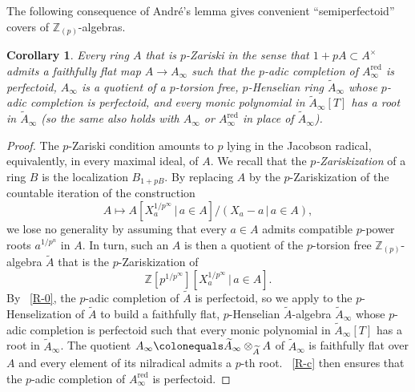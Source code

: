 \documentclass[11pt, reqno]{amsart}
\newcommand{\bZ}{\mathbb{Z}}
\newcommand{\ce}{\colonequals}
\newcommand{\ra}{\rightarrow}
\newcommand{\red}{{\mathrm{red}}}		%
\newcommand{\tensor}{\otimes} 			%
\newcommand{\wt}{\widetilde}
\providecommand{\up}[1]{{\upshape(}#1{\upshape)}}
\newcommand{\bpf}{\begin{proof}}
\newcommand{\epf}{\end{proof}}
\newcommand{\bcor}{\begin{cor}}
\newcommand{\ecor}{\end{cor}}
\newcommand{\brem}{\begin{rem}}
\newcommand{\erem}{\end{rem}}
\numberwithin{equation}{numberingbase}
\theoremstyle{thms}
\newtheorem{cor}[numberingbase]{Corollary}
\theoremstyle{claims}
\theoremstyle{defs}
\newtheorem{rem}[numberingbase]{Remark}
\theoremstyle{thms}
\theoremstyle{defs}
\theoremstyle{subsection-tweak}
\theoremstyle{subsection-tweak}
\begin{document}


The following consequence of Andr\'{e}'s lemma gives convenient ``semiperfectoid'' covers of $\bZ_{(p)}$-algebras. 

\bcor \label{cor:semiperfectoid-cover}
Every ring $A$ that is $p$-Zariski in the sense that $1 + pA \subset A^\times$ admits a faithfully flat map $A \ra A_\infty$ such that the $p$-adic completion of $A_\infty^\red$ is perfectoid, $A_\infty$ is a quotient of a $p$-torsion free, $p$-Henselian ring $\wt{A}_\infty$ whose $p$-adic completion is perfectoid, and every monic polynomial in $\wt{A}_\infty[T]$ has a root in $\wt{A}_\infty$ \up{so the same also holds with $A_\infty$ or $A_\infty^\red$ in place of $\wt{A}_\infty$}.
\ecor

\bpf
The $p$-Zariski condition amounts to $p$ lying in the Jacobson radical, equivalently, in every maximal ideal, of $A$. We recall that the \emph{$p$-Zariskization} of a ring $B$ is the localization $B_{1 + pB}$. By replacing $A$ by the $p$-Zariskization of the countable iteration of the construction 
\[
A \mapsto A[X_a^{1/p^\infty}\, \vert\, a \in A]/(X_a - a \, \vert \, a \in A),
\]
we lose no generality by assuming that every $a\in A$ admits compatible $p$-power roots $a^{1/p^n}$ in $A$. In turn, such an $A$ is then a quotient of the $p$-torsion free $\bZ_{(p)}$-algebra $\wt{A}$ that is the $p$-Zariskization of 
\[
\bZ[p^{1/p^\infty}][X_a^{1/p^{\infty}}\, \vert\, a \in A].
\]
By ~\ref{R-0}, the $p$-adic completion of $\wt{A}$ is perfectoid, so we apply  to the $p$-Henselization of $\wt{A}$ to build a faithfully flat, $p$-Henselian $\wt{A}$-algebra $\wt{A}_\infty$ whose $p$-adic completion is perfectoid such that every monic polynomial in $\wt{A}_\infty[T]$ has a root in $\wt{A}_\infty$. The quotient $A_\infty \ce \wt{A}_\infty \tensor_{\wt{A}} A$ of $\wt{A}_\infty$ is faithfully flat over $A$ and every element of its nilradical admits a $p$-th root. ~\ref{R-c} then ensures that the $p$-adic completion of $A_\infty^\red$ is perfectoid.
\epf
\end{document}
